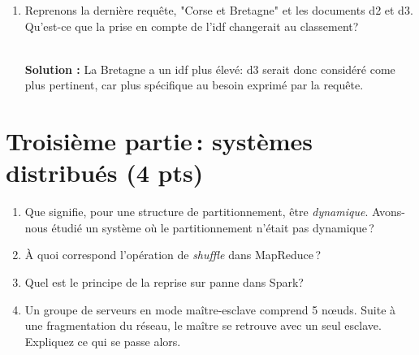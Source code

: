 \documentclass[11pt,a4paper]{article}
\newenvironment{solution}[0]{
~\\ \color{red} \textbf{Solution : }\color{black}}{%
}
\begin{document}
\begin{enumerate}
\begin{solution}
\begin{itemize}
       d4 est premier car il mentionne deux fois la Normandie.
  
  \item Alsace et Corse 
  
    d1 : $\frac{2+1}{\sqrt{5}}$; 
    d2 : $\frac{1+1}{2}$;
     d4 : $\frac{1}{\sqrt{5}}$; 
    
    d1 est premier comme on pouvait s'y attendre: il parle exclusivement
    de la Corse et de l'Alsace. Viennent ensuite d2 puis d4.
    
  \item Corse et Bretagne.
  
    d1 : $\frac{1}{\sqrt{5}}$; 
    d2 : $\frac{2}{2}$;
    d3 :  $\frac{1}{1}$  
    d4 :  $\frac{1}{\sqrt{5}}$  
    
  d2 et d3 arrivent à égalité. Intuitivement, il parlent tous les deux "à moitié"
   de Corse et de Bretagne.  d1 et d4 parlent de Corse \emph{ou} de Bretagne et aussi des autres
    pays.
 \end{itemize}

\end{solution}  
    
    \item Reprenons la dernière requête, "Corse et Bretagne" et les documents d2 et d3.
       Qu'est-ce que la prise en compte de l'idf changerait au classement?
    
\begin{solution}
La Bretagne a un idf plus élevé: d3 serait donc considéré come plus pertinent, 
car plus spécifique au besoin exprimé par la requête.
\end{solution}

  \end{enumerate}


\section*{Troisième partie\,: systèmes distribués (4 pts)}


\begin{enumerate}

  \item Que signifie, pour  une structure de partitionnement, être \emph{dynamique}. Avons-nous
     étudié un système où le partitionnement n'était pas dynamique\,?
   
    \item À quoi correspond l'opération de \textit{shuffle} dans MapReduce\,?
   
   
   \item Quel est le principe de la reprise sur panne dans Spark?\,
   
   \item Un groupe de serveurs en mode maître-esclave comprend 5 n{\oe}uds. Suite à une fragmentation
du réseau, le maître se retrouve  avec un seul esclave.  Expliquez ce qui se passe alors.
   
\end{enumerate}
\end{document}
